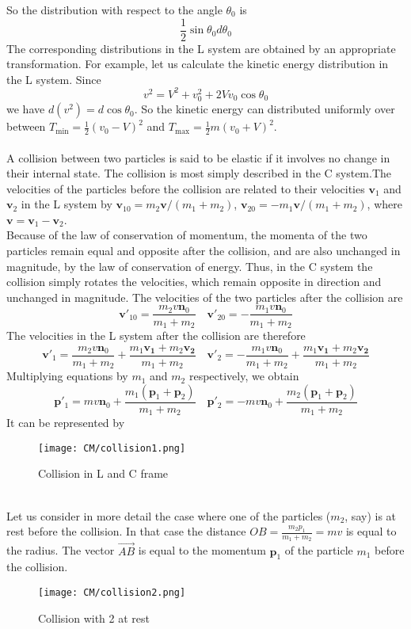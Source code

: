 So the distribution with respect to the angle $\theta_0$ is
\[\frac{1}{2}\sin\theta_0 d\theta_0\]
The corresponding distributions in the L system are obtained by an appropriate transformation. For example, let us calculate the kinetic energy distribution in the L system.
Since
\[v^2 = V^2 + v_0^2 + 2Vv_0\cos\theta_0\] 
we have $d(v^2) = d\cos\theta_0$. So the kinetic energy can distributed uniformly over between $T_{\mathrm{min}} = \frac{1}{2}(v_0-V)^2$ and $T_{\mathrm{max}}= \frac{1}{2}m(v_0+V)^2$.\\ \\
A collision between two particles is said to be elastic if it involves no change in their internal state. The collision is most simply described in the C system.The velocities of the particles before the collision are related to their velocities $\bm{v}_1$ and
$\bm{v}_2$ in the L system by $\bm{v}_{10} = m_2\bm{v}/(m_1+m_2)$, $\bm{v}_{20} = -m_1\bm{v}/(m_1+m_2)$,
where $\bm{v} = \bm{v}_1-\bm{v}_2$.\\
Because of the law of conservation of momentum, the momenta of the two particles remain equal and opposite after the collision, and are also unchanged in magnitude, by the law of conservation of energy. 
Thus, in the C system the collision simply rotates the velocities, which remain opposite in direction and unchanged in magnitude. The velocities of the two particles after the collision are
\[\bm{v}'_{10} = \frac{m_2v\bm{n}_0}{m_1+m_2} \quad \bm{v}'_{20} = -\frac{m_1v\bm{n}_0}{m_1+m_2}\]
The velocities in the L system after the collision are therefore
\[\bm{v}'_{1} = \frac{m_2v\bm{n}_0}{m_1+m_2} + \frac{m_1\bm{v_1}+m_2\bm{v_2}}{m_1+m_2} \quad \bm{v}'_{2} = -\frac{m_1v\bm{n}_0}{m_1+m_2} + \frac{m_1\bm{v_1}+m_2\bm{v_2}}{m_1+m_2}\]
Multiplying equations by $m_1$ and $m_2$ respectively, we obtain
\[\bm{p}'_{1} = mv\bm{n}_0 + \frac{m_1(\bm{p}_1 + \bm{p}_2)}{m_1+m_2} \quad \bm{p}'_{2} = -mv\bm{n}_0 + \frac{m_2(\bm{p}_1 + \bm{p}_2)}{m_1+m_2}\]
It can be represented by
\begin{figure}[!h]
	\centering
	\texttt{[image: CM/collision1.png]}
	\caption{Collision in L and C frame}
\end{figure}\\
Let us consider in more detail the case where one of the particles ($m_2$, say) is at rest before the collision. In that case the distance $OB = \frac{m_2p_1}{m_1+m_2} = mv$ is equal to the radius. The vector $\vec{AB}$ is equal to the
momentum $\bm{p}_1$ of the particle $m_1$ before the collision.
\begin{figure}[!h]
	\centering
	\texttt{[image: CM/collision2.png]}
	\caption{Collision with 2 at rest}
\end{figure}\\
